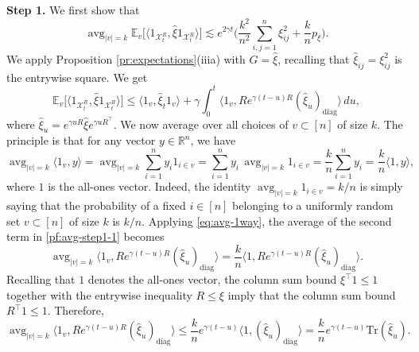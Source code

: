 \documentclass[11pt,reqno]{amsart}
\numberwithin{equation}{section}
\theoremstyle{definition}
\def\E{{\mathbb E}}
\def\R{{\mathbb R}}
\def\tr{{\mathrm{Tr}}}
\def\X{{\mathcal X}}
\DeclareMathOperator*{\avg}{avg}
\begin{document}
\noindent\textbf{Step 1.}
We first show that
\begin{equation}
\avg_{|v|=k}\E_v\big[  \langle 1_{\X_t^{R}}, \widehat{\xi} 1_{\X_t^{R}}\rangle  \big] \lesssim e^{2\gamma t}\bigg(\frac{k^2}{n^2} \sum_{i,j=1}^n  \xi_{ij}^2 + \frac{k }{n } p_\xi \bigg). \label{pf:avg-step1}
\end{equation}
We apply Proposition \ref{pr:expectations}(iiia) with $G=\widehat{\xi}$, recalling that $\widehat{\xi}_{ij}=\xi_{ij}^2$ is the entrywise square. We get
\begin{equation}
\E_v\big[  \langle 1_{\X_t^{R}}, \widehat{\xi} 1_{\X_t^{R}}\rangle  \big] \le \langle 1_v,\widehat{\xi}_t 1_v\rangle + \gamma \int_0^t  \Big\langle 1_v, R e^{\gamma (t-u)R} (\widehat{\xi}_u)_{\mathrm{diag}}\Big\rangle \,du, \label{pf:avg-step1-1}
\end{equation}
where $\widehat{\xi}_u = e^{\gamma u R}\widehat{\xi}e^{\gamma u R^\top}$. We now average over all choices of $v \subset [n]$ of size $k$. 
The principle is that for any vector $y \in \R^n$, we have
	\begin{equation}
	\avg_{|v|=k} \langle 1_v, y\rangle =\avg_{|v|=k} \sum_{i=1}^n y_i 1_{i \in v} = \sum_{i=1}^n y_i \, \avg_{|v|=k}  1_{i \in v} = \frac{k}{n}\sum_{i=1}^n y_i = \frac{k}{n}\langle 1, y\rangle , \label{eq:avg-1way}
	\end{equation}
	where $1$ is the all-ones vector.
	Indeed, the identity $\avg_{|v|=k}  1_{i \in v}=k/n$ is simply saying that the probability of a fixed $i \in [n]$ belonging to a uniformly random set $v \subset [n]$ of size $k$ is $k/n$.
Applying \eqref{eq:avg-1way}, the average of the second term in \eqref{pf:avg-step1-1} becomes 
\begin{equation*}
\avg_{|v|=k}\Big\langle 1_v, R e^{\gamma (t-u)R} (\widehat{\xi}_u)_{\mathrm{diag}}\Big\rangle = \frac{k}{n}\Big\langle 1 , R e^{\gamma (t-u)R} (\widehat{\xi}_u)_{\mathrm{diag}}\Big\rangle.
\end{equation*}
Recalling that $1$ denotes the all-ones vector, the column sum bound $\xi^\top 1 \le 1$ together with the entrywise inequality $R \le \xi$ imply that the column sum bound  $R^\top 1 \le 1$. Therefore,
\begin{equation}
\avg_{|v|=k}\Big\langle 1_v, R e^{\gamma (t-u)R} (\widehat{\xi}_u)_{\mathrm{diag}} \Big\rangle  \le \frac{k}{n}e^{\gamma (t-u) }\Big\langle 1 ,  (\widehat{\xi}_u)_{\mathrm{diag}}\Big\rangle = \frac{k}{n}e^{\gamma (t-u) }\tr(\widehat{\xi}_u).\label{pf:avg-step1-2}
\end{equation}
\end{document}
